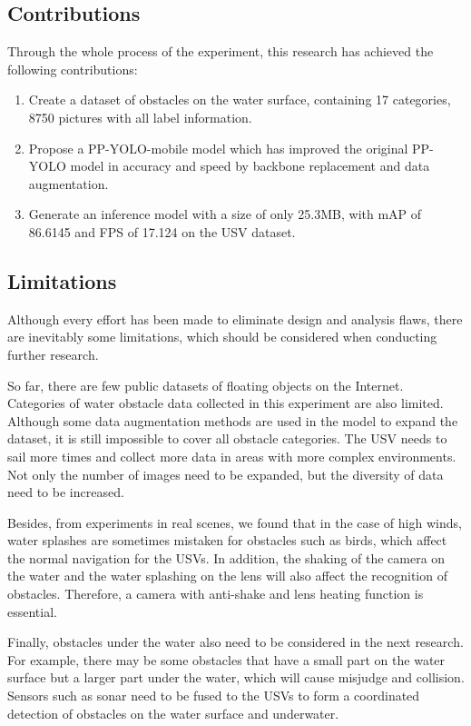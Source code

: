 \documentclass[sensors,article,submit,moreauthors,pdftex]{Definitions/mdpi}
\begin{document}
\begin{paracol}{2}
\subsection{Contributions}
Through the whole process of the experiment, this research has achieved the following contributions:

\begin{enumerate}

\item Create a dataset of obstacles on the water surface, containing 17 categories, 8750 pictures with all label information.
\item Propose a PP-YOLO-mobile model which has improved the original PP-YOLO model in accuracy and speed by backbone replacement and data augmentation.
\item Generate an inference model with a size of only 25.3MB, with mAP of 86.6145 and FPS of 17.124 on the USV dataset.

\end{enumerate}

\subsection{Limitations}
Although every effort has been made to eliminate design and analysis flaws, there are inevitably some limitations, which should be considered when conducting further research.

So far, there are few public datasets of floating objects on the Internet. Categories of water obstacle data collected in this experiment are also limited. Although some data augmentation methods are used in the model to expand the dataset, it is still impossible to cover all obstacle categories. The USV needs to sail more times and collect more data in areas with more complex environments. Not only the number of images need to be expanded, but the diversity of data need to be increased.

Besides, from experiments in real scenes, we found that in the case of high winds, water splashes are sometimes mistaken for obstacles such as birds, which affect the normal navigation for the USVs. In addition, the shaking of the camera on the water and the water splashing on the lens will also affect the recognition of obstacles. Therefore, a camera with anti-shake and lens heating function is essential.

Finally, obstacles under the water also need to be considered in the next research. For example, there may be some obstacles that have a small part on the water surface but a larger part under the water, which will cause misjudge and collision. Sensors such as sonar need to be fused to the USVs to form a coordinated detection of obstacles on the water surface and underwater.




\end{paracol}
\end{document}
